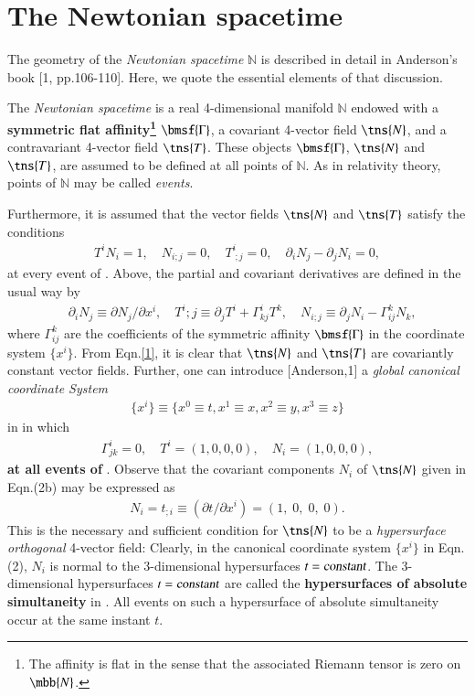 \documentclass[10pt]{article}
\begin{document}
\section{The Newtonian spacetime} 
The geometry of the \textsl{Newtonian spacetime}  
$\mathbb{N}$ is described in detail in Anderson's book [1, 
pp.106-110]. Here, we quote  the essential elements of that 
discussion.

The \textsl{Newtonian spacetime} is a real 4-dimensional 
manifold  $\mathbb{N}$ endowed with a \textbf{symmetric flat 
affinity\footnote{The affinity is flat in the sense that the 
associated Riemann tensor is zero on $\mbb{N}$.}} 
$\bmsf{\Gamma}$, a covariant 4-vector field $\tns{N}$,  and 
a contravariant 4-vector field  $\tns{T}$. These objects  
$\bmsf{\Gamma}$, $\tns{N}$ and $\tns{T}$, are assumed to be 
defined   at all points of $\mathbb{N}$. As in relativity 
theory, points of $\mathbb{N}$ may be  called 
\textsl{events}. 

Furthermore, it is  assumed that the vector fields $\tns{N}$ 
and $\tns{T}$ satisfy the conditions 
\begin{align}\label{1} 
T^i N_i =1,\quad  N_{i;j}=0, \quad  T^i_{\;;j}=0, 
\quad  \partial_i  N_j - \partial_j N_i=0,
\end{align}
at every event of . Above,  the partial  and 
covariant derivatives are defined in the usual way by
\begin{align*}
& \partial_i  N_j\equiv \partial N_j/\partial x^i,\quad 
T^i;j\equiv\partial_j  T^i+\Gamma^i_{kj} T^k,\quad 
N_{i;j}\equiv\partial_j  N_i-\Gamma^k_{ij} N_k,
  \end{align*}
where $\Gamma^k_{ij}$ are the coefficients of the symmetric 
affinity $\bmsf{\Gamma}$ in the coordinate system 
$\{x^i\}$. 
From Eqn.\eqref{1}, it is clear that $\tns{N}$ and 
$\tns{T}$ are covariantly constant vector fields. Further, 
one can introduce [Anderson,1] a \textsl{global canonical 
coordinate System} 
\begin{align}\label{2}
 \{x^i\}\equiv \{x^0\equiv t, x^1\equiv 
x,x^2\equiv y,x^3\equiv z\} 
\end{align}
in    in which 
\begin{align}\tag{2b}
\Gamma^i_{jk}=0, 
\quad 
T^i=(1,0,0,0),
\quad 
N_i=(1,0,0,0),
\end{align}
\textbf{at all events of} . Observe that   the 
covariant components $N_i$ of $\tns{N}$ given in Eqn.(2b) 
may be expressed as  
\begin{align*}\tag{2c}
N_i=t_{;i} \equiv (\partial t/\partial 
x^i)=(1,\;0,\;0,\;0).
\end{align*}
This is the necessary and sufficient condition for 
$\tns{N}$ to be  a \textsl{hypersurface orthogonal} 
4-vector 
field:  Clearly, in the canonical coordinate system 
$\{x^i\}$  in Eqn.(2), $N_i$ is normal to the 
3-dimensional 
hypersurfaces $t=\textsl{constant}$. The 3-dimensional 
hypersurfaces  $t=\textsl{constant}$  are called the 
\textbf{hypersurfaces of absolute simultaneity} in . 
All events on such a hypersurface of absolute simultaneity 
occur at the same instant  $t$. 
\end{document}
